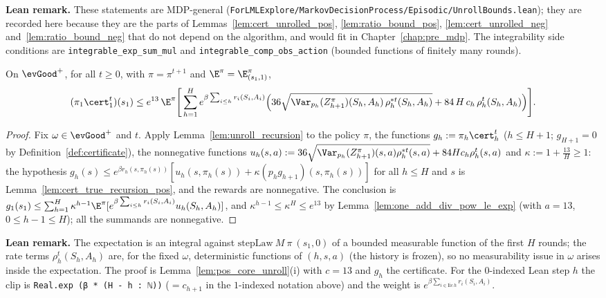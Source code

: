 \textbf{Lean remark.} These statements are MDP-general
(\texttt{ForLMLExplore/MarkovDecisionProcess/Episodic/UnrollBounds.lean}); they are recorded here
because they are the parts of Lemmas~\ref{lem:cert_unrolled_pos}, \ref{lem:ratio_bound_pos},
\ref{lem:cert_unrolled_neg} and~\ref{lem:ratio_bound_neg} that do not depend on the algorithm, and
would fit in Chapter~\ref{chap:pre_mdp}. The integrability side conditions are
\texttt{integrable\_exp\_sum\_mul} and \texttt{integrable\_comp\_obs\_action} (bounded functions of finitely
many rounds).

\begin{lemma}\label{lem:cert_unrolled_pos}
\leanok
{}
On $\evGood^+$, for all $t \ge 0$, with $\pi = \pi^{t+1}$ and $\E^\pi = \E^\pi_{(s_1, 1)}$,
\[
  (\pi_1\cert_1^t)(s_1) \le e^{13}\,\E^\pi\Bigg[\sum_{h=1}^H e^{\beta\sum_{i \le h} r_i(S_i, A_i)}
  \Big(36\sqrt{\Var_{p_h}(Z^\pi_{h+1})(S_h, A_h)\,\rho^{*t}_h(S_h, A_h)}
  + 84\,H\,c_h\,\rho^t_h(S_h, A_h)\Big)\Bigg] .
\]
\end{lemma}

\begin{proof}
\leanok
Fix $\omega \in \evGood^+$ and $t$. Apply Lemma~\ref{lem:unroll_recursion} to the policy $\pi$, the
functions $g_h := \pi_h\cert_h^t$ ($h \le H + 1$; $g_{H+1} = 0$ by Definition~\ref{def:certificate}), the
nonnegative functions
$u_h(s,a) := 36\sqrt{\Var_{p_h}(Z^\pi_{h+1})(s,a)\rho^{*t}_h(s,a)} + 84Hc_h\rho^t_h(s,a)$ and
$\kappa := 1 + \frac{13}{H} \ge 1$: the hypothesis
$g_h(s) \le e^{\beta r_h(s, \pi_h(s))}[u_h(s, \pi_h(s)) + \kappa(p_hg_{h+1})(s, \pi_h(s))]$ for all
$h \le H$ and $s$ is Lemma~\ref{lem:cert_true_recursion_pos}, and the rewards are nonnegative. The
conclusion is $g_1(s_1) \le \sum_{h=1}^H\kappa^{h-1}\E^\pi[e^{\beta\sum_{i \le h} r_i(S_i,A_i)}u_h(S_h,A_h)]$, and
$\kappa^{h-1} \le \kappa^H \le e^{13}$ by Lemma~\ref{lem:one_add_div_pow_le_exp} (with $a = 13$,
$0 \le h - 1 \le H$); all the summands are nonnegative.
\end{proof}

\textbf{Lean remark.} The expectation is an integral against
$\mathrm{stepLaw}\ M\ \pi\ (s_1, 0)$ of a bounded measurable function of the first $H$ rounds;
the rate terms $\rho^t_h(S_h, A_h)$ are, for the fixed $\omega$, deterministic functions of $(h, s, a)$
(the history is frozen), so no measurability issue in $\omega$ arises inside the expectation.
The proof is Lemma~\ref{lem:pos_core_unroll}(i) with $c = 13$ and $g_h$ the certificate. For the
$0$-indexed Lean step $h$ the clip is \texttt{Real.exp (β * (H - h : ℕ))} ($= c_{h+1}$ in the
$1$-indexed notation above) and the weight is $e^{\beta\sum_{i \in \mathrm{Iic}\,h} r_i(S_i, A_i)}$.

